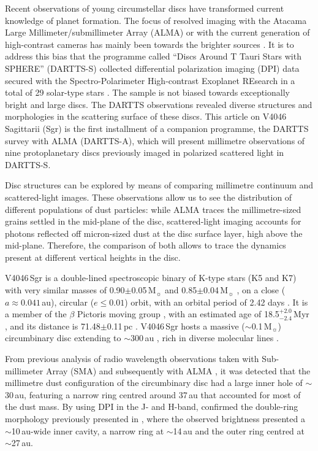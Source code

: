 \documentclass[fleqn,usenatbib,useAMS]{mnras}
\begin{document}
Recent observations of young circumstellar discs have transformed current knowledge of planet formation. The focus of resolved imaging with the Atacama Large Millimeter/submillimeter Array (ALMA) or with the current generation of high-contrast cameras has mainly been towards the brighter sources \citep[e.g.][]{2020ARA&A..58..483A}. It is to address this bias that the programme called ``Discs Around T Tauri Stars with SPHERE'' (DARTTS-S) collected differential polarization imaging (DPI) data secured with the Spectro-Polarimeter High-contrast Exoplanet REsearch \citep[SPHERE][]{2019A&A...631A.155B} in a total of 29 solar-type stars \citep[][]{Avenhaus_2018,Garufi2020}. The sample is not biased towards exceptionally bright and large discs. The DARTTS observations revealed diverse structures and morphologies in the scattering surface of these discs. This article on V4046 Sagittarii (Sgr) is the first installment of a companion programme, the DARTTS survey with ALMA (DARTTS-A), which will present millimetre observations of nine protoplanetary discs previously imaged in polarized scattered light in DARTTS-S.

Disc structures can be explored by means of comparing millimetre continuum and scattered-light images. These observations allow us to see the distribution of different populations of dust particles: while ALMA traces the millimetre-sized grains settled in the mid-plane of the disc, scattered-light imaging accounts for photons reflected off micron-sized dust at the disc surface layer, high above the mid-plane. Therefore, the comparison of both allows to trace the dynamics present at different vertical heights in the disc.

V4046\,Sgr is a double-lined spectroscopic binary of K-type stars (K5 and K7) with very similar masses of 0.90$\pm$0.05\,M$_{\sun}$ and 0.85$\pm$0.04\,M$_{\sun}$ \citep{Rosenfeld_2012}, on a close ($a \approx 0.041$\,au), circular ($e\leq0.01$) orbit, with an orbital period of 2.42 days \citep{2000IAUS..200P..28Q}. It is a member of the $\beta$ Pictoris moving group \citep{Zuckerman_2004}, with an estimated age of 18.5$^{+2.0}_{-2.4}$\,Myr \citep{2020A&A...642A.179M}, and its distance is 71.48$\pm$0.11\,pc \citep{gaiacollaboration2020gaia}. V4046\,Sgr hosts a massive ($\sim$0.1\,M$_{\sun}$) circumbinary disc extending to $\sim$300\,au \citep{Rosenfeld_2013, Rodriguez_2010}, rich in diverse molecular lines \citep{Kastner_2018}.

From previous analysis of radio wavelength observations taken with Sub-millimeter Array (SMA) \citep{Rosenfeld_2013} and subsequently with ALMA \citep{Guzman_2017,Huang_2017,Bergner_2018,Kastner_2018}, it was detected that the millimetre dust configuration of the circumbinary disc had a large inner hole of $\sim$30\,au, featuring a narrow ring centred around 37\,au that accounted for most of the dust mass. By using DPI in the J- and H-band, \citet{Avenhaus_2018} confirmed the double-ring morphology previously presented in \citet{Rapson_2015}, where the observed brightness presented a $\sim$10\,au-wide inner cavity, a narrow ring at $\sim$14\,au and the outer ring centred at $\sim$27\,au.
\end{document}
